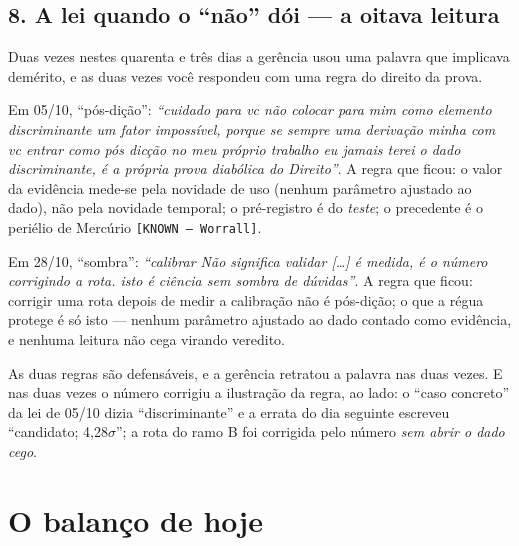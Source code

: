 \section*{8. A lei quando o ``não'' dói --- a oitava leitura}

Duas vezes nestes quarenta e três dias a gerência usou uma palavra que implicava demérito, e as
duas vezes você respondeu com uma regra do direito da prova.

Em 05/10, ``pós-dição'': \emph{``cuidado para vc não colocar para mim como elemento discriminante um
fator impossível, porque se sempre uma derivação minha com vc entrar como pós dicção no meu próprio
trabalho eu jamais terei o dado discriminante, é a própria prova diabólica do Direito''}. A regra
que ficou: o valor da evidência mede-se pela novidade de uso (nenhum parâmetro ajustado ao dado),
não pela novidade temporal; o pré-registro é do \emph{teste}; o precedente é o periélio de Mercúrio
\texttt{[KNOWN --- Worrall]}.

Em 28/10, ``sombra'': \emph{``calibrar Não significa validar [\ldots] é medida, é o número
corrigindo a rota. isto é ciência sem sombra de dúvidas''}. A regra que ficou: corrigir uma rota
depois de medir a calibração não é pós-dição; o que a régua protege é só isto --- nenhum parâmetro
ajustado ao dado contado como evidência, e nenhuma leitura não cega virando veredito.

As duas regras são defensáveis, e a gerência retratou a palavra nas duas vezes. E nas duas vezes o
número corrigiu a ilustração da regra, ao lado: o ``caso concreto'' da lei de 05/10 dizia
``discriminante'' e a errata do dia seguinte escreveu ``candidato; 4,28$\sigma$''; a rota do ramo B
foi corrigida pelo número \emph{sem abrir o dado cego}.


\chapter{O balanço de hoje}

